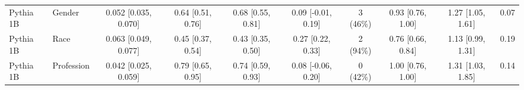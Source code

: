 \begin{tabular}{llcccccccc}
Pythia 1B & Gender & 0.052 [0.035, 0.070] & 0.64 [0.51, 0.76] & 0.68 [0.55, 0.81] & 0.09 [-0.01, 0.19] & 3 (46\%) & 0.93 [0.76, 1.00] & 1.27 [1.05, 1.61] & 0.07 \\
Pythia 1B & Race & 0.063 [0.049, 0.077] & 0.45 [0.37, 0.54] & 0.43 [0.35, 0.50] & 0.27 [0.22, 0.33] & 2 (94\%) & 0.76 [0.66, 0.84] & 1.13 [0.99, 1.31] & 0.19 \\
Pythia 1B & Profession & 0.042 [0.025, 0.059] & 0.79 [0.65, 0.95] & 0.74 [0.59, 0.93] & 0.08 [-0.06, 0.20] & 0 (42\%) & 1.00 [0.76, 1.00] & 1.31 [1.03, 1.85] & 0.14 \\
\bottomrule
\end{tabular}
